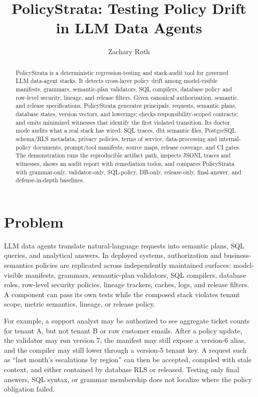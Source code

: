 \documentclass[sigconf]{acmart}
\title{PolicyStrata: Testing Policy Drift in LLM Data Agents}
\author{Zachary Roth}
\affiliation{%
  \institution{Raintree Technology}
  \country{USA}}
\begin{document}
\begin{abstract}
PolicyStrata is a deterministic regression-testing and stack-audit tool for governed LLM data-agent stacks. It detects cross-layer policy drift among model-visible manifests, grammars, semantic-plan validators, SQL compilers, database policy and row-level security, lineage, and release filters. Given canonical authorization, semantic, and release specifications, PolicyStrata generates principals, requests, semantic plans, database states, version vectors, and lowerings; checks responsibility-scoped contracts; and emits minimized witnesses that identify the first violated transition. Its doctor mode audits what a real stack has wired: SQL traces, dbt semantic files, PostgreSQL schema/RLS metadata, privacy policies, terms of service, data-processing and internal-policy documents, prompt/tool manifests, source maps, release coverage, and CI gates. The demonstration runs the reproducible artifact path, inspects JSONL traces and witnesses, shows an audit report with remediation todos, and compares PolicyStrata with grammar-only, validator-only, SQL-policy, DB-only, release-only, final-answer, and defense-in-depth baselines.
\end{abstract}


\maketitle

\section{Problem}

LLM data agents translate natural-language requests into semantic plans, SQL queries, and analytical answers. In deployed systems, authorization and business-semantics policies are replicated across independently maintained surfaces: model-visible manifests, grammars, semantic-plan validators, SQL compilers, database roles, row-level security policies, lineage trackers, caches, logs, and release filters. A component can pass its own tests while the composed stack violates tenant scope, metric semantics, lineage, or release policy.

For example, a support analyst may be authorized to see aggregate ticket counts for tenant A, but not tenant B or raw customer emails. After a policy update, the validator may run version 7, the manifest may still expose a version-6 alias, and the compiler may still lower through a version-5 tenant key. A request such as ``last month's escalations by region'' can then be accepted, compiled with stale context, and either contained by database RLS or released. Testing only final answers, SQL syntax, or grammar membership does not localize where the policy obligation failed.
\end{document}

